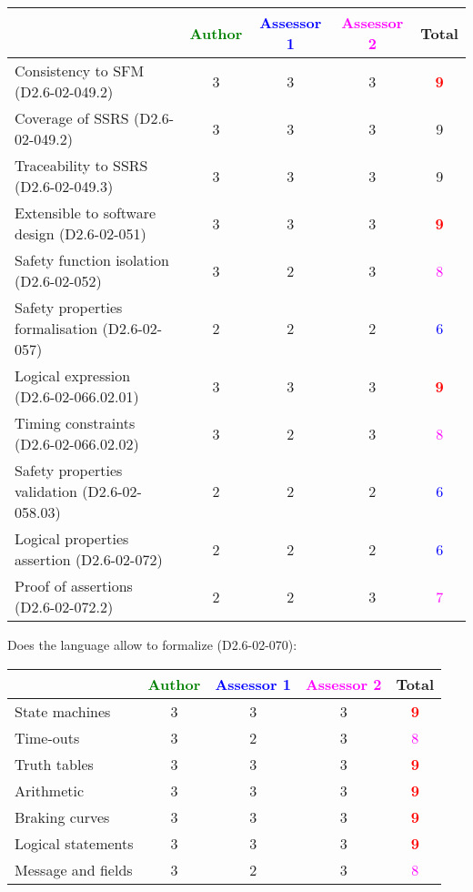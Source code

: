\begin{tabular}{|l | c | c | c | c|}
\hline
& \textcolor{green}{Author} & \textcolor{blue}{Assessor 1} & \textcolor{magenta}{Assessor 2} & Total \\
\hline 
Consistency to SFM (D2.6-02-049.2) & 3    & 3    &3 & \textcolor{red}{\textbf{9}} \\
\hline
Coverage of SSRS (D2.6-02-049.2)  &3 & 3    &3 &  9 \\
\hline
Traceability to  SSRS (D2.6-02-049.3)  &3 & 3    &3 &  9 \\
\hline
Extensible to software design (D2.6-02-051)  &3 & 3    &3 & \textcolor{red}{\textbf{9}}  \\
\hline
Safety function isolation (D2.6-02-052)  &  3& 2    &3 & \textcolor{magenta}{8}  \\
\hline 
Safety properties formalisation (D2.6-02-057)  &  2&
2&2 & \textcolor{blue}{6}  \\
\hline
Logical expression (D2.6-02-066.02.01)  &  3&3 &3 & \textcolor{red}{\textbf{9}}  \\
\hline
Timing constraints (D2.6-02-066.02.02)  &  3&2 &3 & \textcolor{magenta}{8} \\
\hline
Safety properties validation (D2.6-02-058.03)  &  2& 2    &2 & \textcolor{blue}{6}  \\
\hline
Logical properties assertion (D2.6-02-072)  &  2& 2    &2 & \textcolor{blue}{6} \\
\hline
Proof of assertions (D2.6-02-072.2)  &  2 & 2    &3 & \textcolor{magenta}{7} \\
\hline
\end{tabular}

Does the language allow to  formalize (D2.6-02-070):

\begin{tabular}{|l | c | c | c | c|}
\hline
& \textcolor{green}{Author} & \textcolor{blue}{Assessor 1} & \textcolor{magenta}{Assessor 2} & Total \\
\hline 
State machines  & 3    & 3    &3 & \textcolor{red}{\textbf{9}} \\
\hline
Time-outs  & 3    & 2    &3 & \textcolor{magenta}{8} \\
\hline
Truth tables  & 3    & 3    &3 & \textcolor{red}{\textbf{9}} \\
\hline
Arithmetic  & 3   & 3    &3 & \textcolor{red}{\textbf{9}} \\
\hline
Braking curves  & 3   & 3    &3 & \textcolor{red}{\textbf{9}} \\
\hline
Logical statements & 3   & 3    &3 & \textcolor{red}{\textbf{9}} \\
\hline
Message and fields &3 & 2    &3 & \textcolor{magenta}{8} \\
\hline
\end{tabular}

